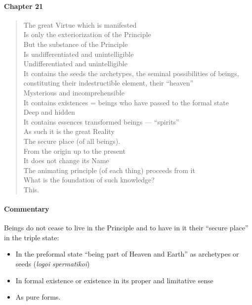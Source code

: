 \paragraph{Chapter 21}

\begin{verse}
The great Virtue which is manifested\\ Is only the exteriorization of the Principle\\ But the substance of the Principle\\ Is undifferentiated and unintelligible\\ Undifferentiated and unintelligible\\ It contains the seeds the archetypes, the seminal possibilities of beings, constituting their indestructible element, their ``heaven'' \\ Mysterious and incomprehensible\\ It contains existences = beings who have passed to the formal state \\ Deep and hidden\\ It contains essences transformed beings --- ``spirits'' \\ As such it is the great Reality\\ The secure place (of all beings).\\ From the origin up to the present\\ It does not change its Name\\ The animating principle (of each thing) proceeds from it\\ What is the foundation of such knowledge?\\ This.
\end{verse}

\paragraph{Commentary}


Beings do not cease to live in the Principle and to have in it their ``secure place'' in the triple state:

\begin{itemize}


\item In the preformal state ``being part of Heaven and Earth'' as archetypes or seeds (\emph{logoi spermatikoi})

\item In formal existence or existence in its proper and limitative sense

\item As pure forms.
\end{itemize}


